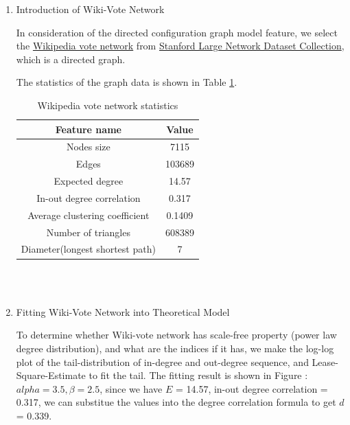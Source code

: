 \documentclass{article}
\begin{document}
\begin{enumerate}
\item Introduction of Wiki-Vote Network\\

\par In consideration of the directed configuration graph model feature, we select the \hyperlink{wikivote_intro}{Wikipedia vote network} from \href{https://snap.stanford.edu/data/}{Stanford Large Network Dataset Collection}, which is a directed graph. 
\par The statistics of the graph data is shown in Table \ref{wikivote_stats}.
\quad\\
\begin{table}[!hbp]
\centering
\caption{Wikipedia vote network statistics}\label{wikivote_stats}
\begin{tabular}{cc}

\toprule
Feature name & Value\\
\midrule
Nodes size & 7115\\
Edges & 103689\\
Expected degree & 14.57\\
In-out degree correlation & 0.317\\
Average clustering coefficient & 0.1409\\
Number of triangles & 608389\\
Diameter(longest shortest path) & 7\\

\bottomrule

\cline{1-2}
\hline
\end{tabular}
\end{table}
\\
\quad\\

\item Fitting Wiki-Vote Network into Theoretical Model\\

\par To determine whether Wiki-vote network has scale-free property (power law degree distribution), and what are the indices if it has, we make the log-log plot of the tail-distribution of in-degree and out-degree sequence, and Lease-Square-Estimate to fit the tail. \hypertarget{powerlaw_fit}{The fitting result} is shown in Figure  :$alpha =
3.5, \beta = 2.5$,  since we have $E$ = 14.57, in-out degree correlation = 0.317, we can substitue the values into the degree correlation formula to get $d$ = 0.339. 



\end{enumerate}
\end{document}
